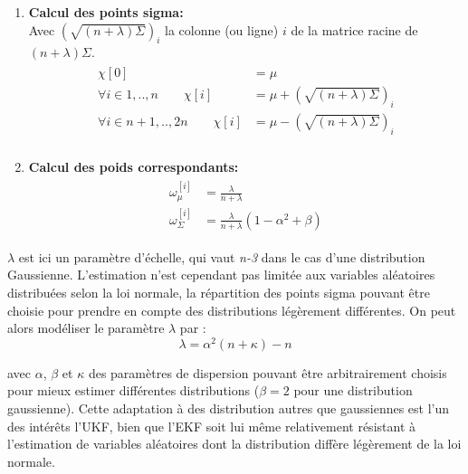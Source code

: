 \begin{enumerate}
	\item{\textbf{Calcul des points sigma:}}\\
	Avec $\left( \sqrt{(n+\lambda) \Sigma }\right)_i$ la colonne (ou ligne) $i$ de la matrice racine de $(n+\lambda) \Sigma$.
	\begin{align} \label{eq:ch4_transformation_inodore}
		\begin{split}
			\chi{[0]} &= \mu \\
			\forall i \in {1,..,n} \qquad \chi{[i]} &= \mu + \left( \sqrt{(n+\lambda) \Sigma }\right)_i \\
			\forall i \in {n+1,..,2n} \qquad  \chi{[i]} &= \mu - \left( \sqrt{(n+\lambda) \Sigma }\right)_i \\
		\end{split}
	\end{align}
	
	\item{\textbf{Calcul des poids correspondants:}}
	\begin{align}
		\begin{split}
			\omega_\mu^{[i]} &= \frac{\lambda}{n+\lambda} \\
			\omega_\Sigma^{[i]} &= \frac{\lambda}{n+\lambda} (1 - \alpha^2 +\beta)
		\end{split}
	\end{align}
\end{enumerate}

$\lambda$ est ici un paramètre d'échelle, qui vaut \emph{n-3} dans le cas d'une distribution Gaussienne. L'estimation n'est cependant pas limitée aux variables aléatoires distribuées selon la loi normale, la répartition des points sigma pouvant être choisie pour prendre en compte des distributions légèrement différentes. On peut alors modéliser le paramètre $\lambda$ par :
\begin{equation}
\lambda = \alpha^2(n + \kappa) -n %
\end{equation}

avec $\alpha$, $\beta$ et $\kappa$ des paramètres de dispersion pouvant être arbitrairement choisis pour mieux estimer différentes distributions ($\beta = 2$  pour une distribution gaussienne). Cette adaptation à des distribution autres que gaussiennes est l'un des intérêts l'UKF, bien que l'EKF soit lui même relativement résistant à l'estimation de variables aléatoires dont la distribution diffère légèrement de la loi normale.\\

